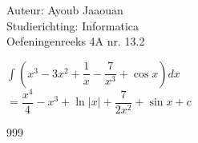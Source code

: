 \documentclass[a4paper]{article}
\begin{document}
\noindent \large Auteur: Ayoub Jaaouan \\
\noindent \large Studierichting: Informatica\\
\noindent \large Oefeningenreeks 4A nr. 13.2\\

\medskip

\normalsize

$\displaystyle\int \left( x^3 - 3x^2 + \dfrac{1}{x} - \dfrac{7}{x^3} + \cos x \right)  dx  $\\

$ = \dfrac{x^4}{4} - x^3 + \ln |x| + \dfrac{7}{2x^2} + \sin x + c $\\


\begin{thebibliography}{999}
\end{thebibliography}
\end{document}
